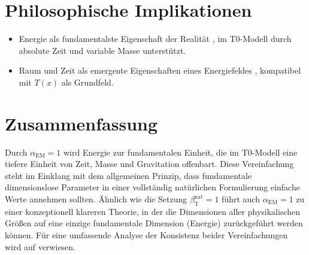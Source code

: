 \documentclass{article}
\newcommand{\Tfield}{T(x)}
\newcommand{\alphaEM}{\alpha_{\text{EM}}}
\newcommand{\betaT}{\beta_{\text{T}}}
\begin{document}
	\section{Philosophische Implikationen}
	\begin{itemize}
		\item Energie als fundamentalste Eigenschaft der Realität \cite{Wilczek2008}, im T0-Modell durch absolute Zeit und variable Masse unterstützt.
		\item Raum und Zeit als emergente Eigenschaften eines Energiefeldes \cite{Verlinde2011}, kompatibel mit \(\Tfield\) als Grundfeld.
	\end{itemize}
	
	\section{Zusammenfassung}
	Durch \(\alphaEM = 1\) wird Energie zur fundamentalen Einheit, die im T0-Modell eine tiefere Einheit von Zeit, Masse und Gravitation offenbart. Diese Vereinfachung steht im Einklang mit dem allgemeinen Prinzip, dass fundamentale dimensionslose Parameter in einer vollständig natürlichen Formulierung einfache Werte annehmen sollten. Ähnlich wie die Setzung \(\betaT^{\text{nat}} = 1\) führt auch \(\alphaEM = 1\) zu einer konzeptionell klareren Theorie, in der die Dimensionen aller physikalischen Größen auf eine einzige fundamentale Dimension (Energie) zurückgeführt werden können. Für eine umfassende Analyse der Konsistenz beider Vereinfachungen wird auf \cite{pascher_alphabeta_2025} verwiesen.
	
\end{document}
